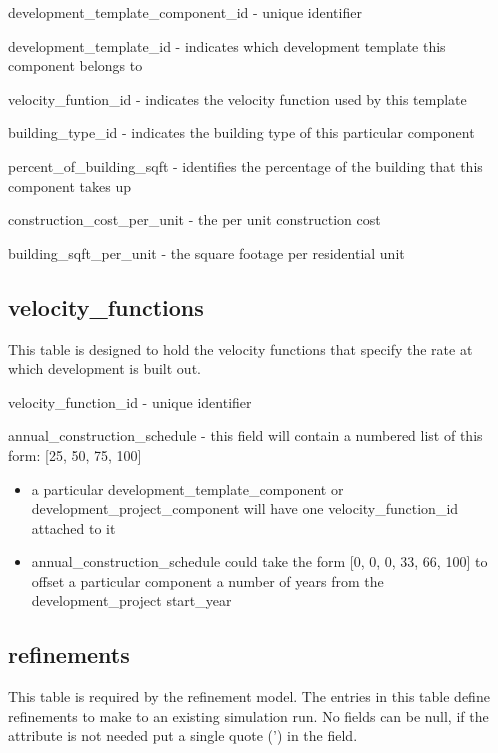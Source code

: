 \begin{description}
\item development\_template\_component\_id - unique identifier
\item development\_template\_id - indicates which development template this component belongs to
\item velocity\_funtion\_id - indicates the velocity function used by this template
\item building\_type\_id - indicates the building type of this particular component
\item percent\_of\_building\_sqft - identifies the percentage of the building that this component takes up
\item construction\_cost\_per\_unit - the per unit construction cost
\item building\_sqft\_per\_unit - the square footage per residential unit 
\end{description}

\subsection{velocity\_functions} 

This table is designed to hold the velocity functions that specify the rate at which development is built out.

\begin{description}
\item velocity\_function\_id - unique identifier
\item annual\_construction\_schedule - this field will contain a numbered list of this form: [25, 50, 75, 100]
  \begin{itemize}
  \item a particular development\_template\_component or development\_project\_component will have one velocity\_function\_id attached to it
  \item annual\_construction\_schedule could take the form [0, 0, 0, 33, 66, 100] to offset a particular component a number of years from the 
      development\_project start\_year 
   \end{itemize}
\end{description}

\subsection{refinements} 
\label{sec:refinements}

This table is required by the refinement model. The entries in this table define refinements to make to an existing simulation run. No fields can be null, if the attribute is not needed put a single quote (') in the field.

